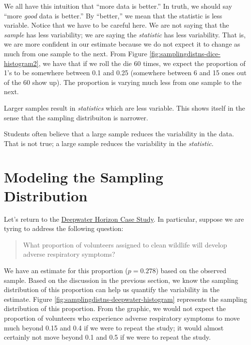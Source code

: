 \documentclass[]{book}
\theoremstyle{definition}
\theoremstyle{definition}
\theoremstyle{remark}
\let\BeginKnitrBlock\begin \let\EndKnitrBlock\end
\begin{document}
We all have this intuition that ``more data is better.'' In truth, we
should say ``more \emph{good} data is better.'' By ``better,'' we mean
that the statistic is less variable. Notice that we have to be careful
here. We are not saying that the \emph{sample} has less variability; we
are saying the \emph{statistic} has less variability. That is, we are
more confident in our estimate because we do not expect it to change as
much from one sample to the next. From Figure
\ref{fig:samplingdistns-dice-histogram2}, we have that if we roll the
die 60 times, we expect the proportion of 1's to be somewhere between
0.1 and 0.25 (somewhere between 6 and 15 ones out of the 60 show up).
The proportion is varying much less from one sample to the next.

\BeginKnitrBlock{rmdkeyidea}
Larger samples result in \emph{statistics} which are less variable. This
shows itself in the sense that the sampling distribuiton is narrower.
\EndKnitrBlock{rmdkeyidea}

\BeginKnitrBlock{rmdtip}
Students often believe that a large sample reduces the variability in
the data. That is not true; a large sample reduces the variability in
the \emph{statistic}.
\EndKnitrBlock{rmdtip}

\section{Modeling the Sampling
Distribution}\label{modeling-the-sampling-distribution}

Let's return to the \protect\hyperlink{CaseDeepwater}{Deepwater Horizon
Case Study}. In particular, suppose we are tyring to address the
following question:

\begin{quote}
What proportion of volunteers assigned to clean wildlife will develop
adverse respiratory symptoms?
\end{quote}

We have an estimate for this proportion (\(p = 0.278\)) based on the
observed sample. Based on the discussion in the previous section, we
know the sampling distribution of this proportion can help us quantify
the variability in the estimate. Figure
\ref{fig:samplingdistns-deepwater-histogram} represents the sampling
distribution of this proportion. From the graphic, we would not expect
the proportion of volunteers who experience adverse respiratory symptoms
to move much beyond 0.15 and 0.4 if we were to repeat the study; it
would almost certainly not move beyond 0.1 and 0.5 if we were to repeat
the study.
\end{document}
